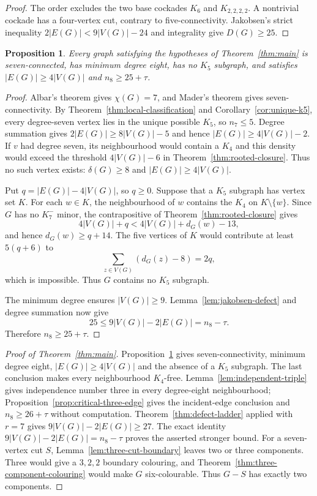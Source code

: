 \documentclass[11pt]{amsart}
\newtheorem{proposition}[theorem]{Proposition}
\begin{document}
\begin{proof}
The order excludes the two base cockades $K_6$ and $K_{2,2,2,2}$.
A nontrivial cockade has a four-vertex cut, contrary to five-connectivity.
Jakobsen's strict inequality $2|E(G)|<9|V(G)|-24$ and integrality give
$D(G)\geq25$.
\end{proof}

\begin{proposition}\label{prop:critical-base}
Every graph satisfying the hypotheses of Theorem~\ref{thm:main} is
seven-connected, has minimum
degree eight, has no $K_5$ subgraph, and satisfies
$|E(G)|\geq4|V(G)|$ and $n_8\geq25+\tau$.
\end{proposition}

\begin{proof}
Albar's theorem gives $\chi(G)=7$, and Mader's theorem gives
seven-connectivity.  By Theorem~\ref{thm:local-classification} and
Corollary~\ref{cor:unique-k5}, every degree-seven vertex lies in the unique
possible $K_5$, so $n_7\leq5$.  Degree summation gives
$2|E(G)|\geq8|V(G)|-5$ and hence $|E(G)|\geq4|V(G)|-2$.
If $v$ had degree seven, its neighbourhood would contain a $K_4$ and this
density would exceed the threshold $4|V(G)|-6$ in
Theorem~\ref{thm:rooted-closure}.  Thus no such vertex exists:
$\delta(G)\geq8$ and $|E(G)|\geq4|V(G)|$.

Put $q=|E(G)|-4|V(G)|$, so $q\geq0$.  Suppose that a $K_5$ subgraph has
vertex set $K$.  For each $w\in K$, the neighbourhood of $w$ contains the
$K_4$ on $K\setminus\{w\}$.  Since $G$ has no $K_7^{-}$ minor, the
contrapositive of Theorem~\ref{thm:rooted-closure} gives
\[
        4|V(G)|+q<4|V(G)|+d_G(w)-13,
\]
and hence $d_G(w)\geq q+14$.  The five vertices of $K$ would contribute at
least $5(q+6)$ to
\[
        \sum_{z\in V(G)}(d_G(z)-8)=2q,
\]
which is impossible.  Thus $G$ contains no $K_5$ subgraph.

The minimum degree ensures $|V(G)|\geq9$.  Lemma~\ref{lem:jakobsen-defect}
and degree summation now give
\[
        25\leq9|V(G)|-2|E(G)|=n_8-\tau.
\]
Therefore $n_8\geq25+\tau$.
\end{proof}





\begin{proof}[Proof of Theorem~\ref{thm:main}]
Proposition~\ref{prop:critical-base} gives seven-connectivity, minimum
degree eight, $|E(G)|\geq4|V(G)|$ and the absence of a $K_5$ subgraph.
The last conclusion makes every neighbourhood $K_4$-free.
Lemma~\ref{lem:independent-triple} gives independence number three in
every degree-eight neighbourhood; Proposition~\ref{prop:critical-three-edge}
gives the incident-edge conclusion and $n_8\geq26+\tau$ without computation.
Theorem~\ref{thm:defect-ladder} applied with $r=7$ gives
$9|V(G)|-2|E(G)|\geq27$.  The exact identity
$9|V(G)|-2|E(G)|=n_8-\tau$ proves the asserted stronger bound.
For a seven-vertex cut $S$, Lemma~\ref{lem:three-cut-boundary} leaves two
or three components.  Three would give a $3,2,2$ boundary colouring, and
Theorem~\ref{thm:three-component-colouring} would make $G$ six-colourable.
Thus $G-S$ has exactly two components.
\end{proof}
\end{document}
